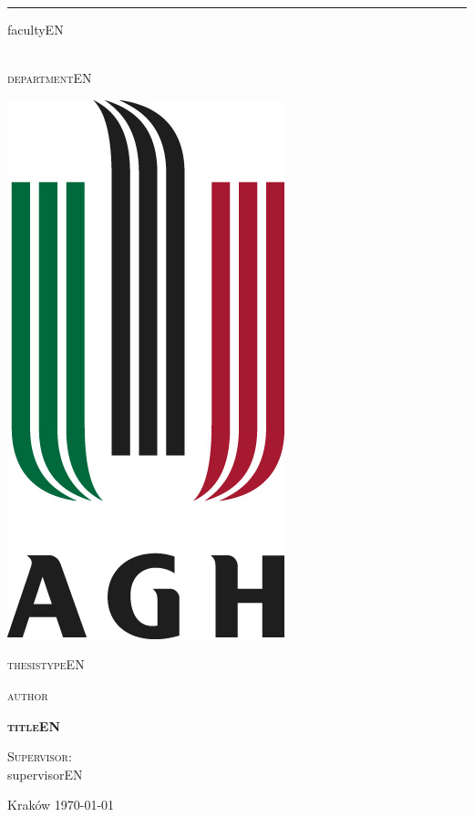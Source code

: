\begin{center}

\thispagestyle{empty}

{

\vspace*{1mm}\rule{\textwidth}{1mm}\vspace*{1mm}

{\large facultyEN}}\\\vspace*{2mm}
{\large\textsc{departmentEN}}\vspace*{1cm}

\includegraphics[scale=0.3]{agh}
\vspace*{1cm}

{\huge\scshape thesistypeEN}\\\vspace*{2cm}

{\LARGE\scshape author}\\\vspace*{2cm}

{\LARGE{\bfseries\scshape titleEN}}\\\vspace*{3cm}

\begin{flushright}
\begin{minipage}[!h]{6cm} 
\large{\scshape Supervisor:}\\ supervisorEN
\end{minipage}
\end{flushright}

\vfill{\Large Kraków \today}

\end{center}
